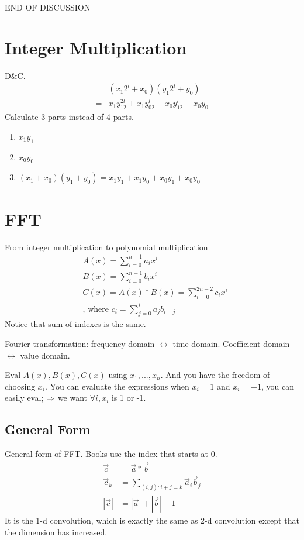 \documentclass[a4paper]{report}
\begin{document}
END OF DISCUSSION

\section{Integer Multiplication}
D\&C. 
\begin{align*}
& (x_1 2^l+x_0)(y_1 2^l+y_0)  \\
=& x_1y_12^{2l}+x_1y_02^l+x_0y_12^l+x_0y_0
\end{align*}
Calculate 3 parts instead of 4 parts. 
\begin{enumerate}
\item $x_1y_1$
\item $x_0y_0$
\item $(x_1+x_0)(y_1+y_0)=x_1y_1+x_1y_0+x_0y_1+x_0y_0$ 
\end{enumerate}
\section{FFT}
From integer multiplication to polynomial multiplication 
\begin{align*}
& A(x) = \sum_{i=0}^{n-1} {a_i x^i}\\
& B(x) = \sum_{i=0}^{n-1} {b_i x^i}\\
& C(x) = A(x)*B(x) = \sum_{i=0}^{2n-2} {c_i x^i} \\
& \text{, where } c_i = \sum_{j=0}^i {a_j b_{i-j}}
\end{align*}
Notice that sum of indexes is the same.

Fourier transformation: frequency domain $\leftrightarrow$ time domain. Coefficient domain $\leftrightarrow$ value domain. 

Eval $A(x), B(x), C(x)$ using $x_1, ..., x_n$. And you have the freedom of choosing $x_i$. You can evaluate the expressions when  $x_i=1$ and $x_i=-1$, you can easily eval; $\Rightarrow$ we want $\forall i, x_i$ is 1 or -1. 
\subsection{General Form}
General form of FFT. Books use the index that starts at 0. 
\begin{align*}
\vec c &= \vec a*\vec b \\
\vec c_k &= \sum_{(i,j): i+j=k} \vec a_i\vec b_j\\
|\vec c| &= |\vec a|+|\vec b| -1 
\end{align*}
It is the 1-d convolution, which is exactly the same as 2-d convolution except that the dimension has increased. 
\end{document}
